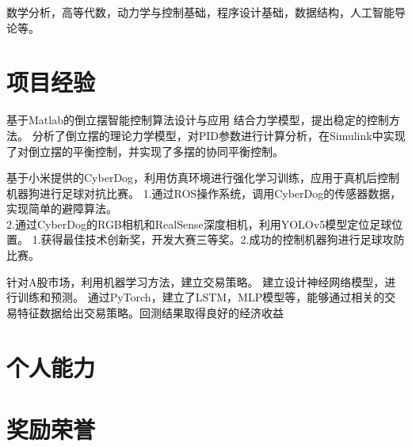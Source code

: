 \documentclass{resume}
\begin{document}
\qquad \qquad 数学分析，高等代数，动力学与控制基础，程序设计基础，数据结构，人工智能导论等。

\section{项目经验}
\Content
{基于Matlab的倒立摆智能控制算法设计与应用}
{结合力学模型，提出稳定的控制方法。}
{分析了倒立摆的理论力学模型，对PID参数进行计算分析，在Simulink中实现了对倒立摆的平衡控制，并实现了多摆的协同平衡控制。}

\Content
{基于小米提供的CyberDog，利用仿真环境进行强化学习训练，应用于真机后控制机器狗进行足球对抗比赛。}
{1.通过ROS操作系统，调用CyberDog的传感器数据，实现简单的避障算法。\\
2.通过CyberDog的RGB相机和RealSense深度相机，利用YOLOv5模型定位足球位置。}
{1.获得最佳技术创新奖，开发大赛三等奖。2.成功的控制机器狗进行足球攻防比赛。}

\Content
{针对A股市场，利用机器学习方法，建立交易策略。}
{建立设计神经网络模型，进行训练和预测。}
{通过PyTorch，建立了LSTM，MLP模型等，能够通过相关的交易特征数据给出交易策略。回测结果取得良好的经济收益}

\section{个人能力}

\section{奖励荣誉}
\end{document}
